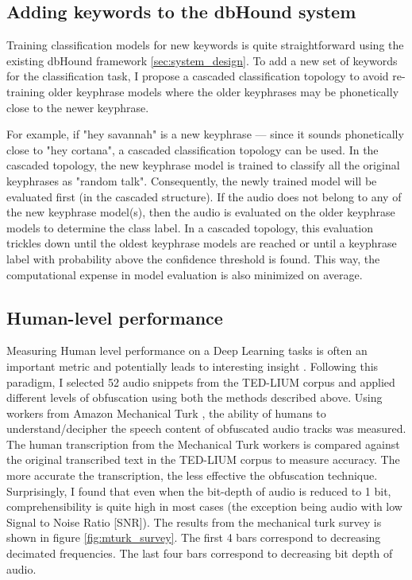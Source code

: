 \subsection{Adding keywords to the dbHound system}

Training classification models for new keywords is quite straightforward using the existing dbHound framework \ref{sec:system_design}.
 To add a new set of keywords for the classification task, I propose a cascaded classification topology to avoid re-training older keyphrase models where the older keyphrases may be phonetically close to the newer keyphrase.


For example, if "hey savannah" is a new keyphrase --- since it sounds phonetically close to "hey cortana", a cascaded classification topology can be used.
 In the cascaded topology, the new keyphrase model is trained to classify all the original keyphrases as "random talk".
 Consequently, the newly trained model will be evaluated first (in the cascaded structure).
 If the audio does not belong to any of the new keyphrase model(s), then the audio is evaluated on the older keyphrase models to determine the class label.
 In a cascaded topology, this evaluation trickles down until the oldest keyphrase models are reached or until a keyphrase label with probability above the confidence threshold is found.
 This way, the computational expense in model evaluation is also minimized on average.




\subsection{Human-level performance}

Measuring Human level performance on a Deep Learning tasks is often an important metric and potentially leads to interesting insight \cite{NutsAndBoltsOfDL}.
 Following this paradigm, I selected 52 audio snippets from the TED-LIUM corpus \cite{TEDLIUMCorpus} and applied different levels of obfuscation using both the methods described above.
 Using workers from Amazon Mechanical Turk \cite{mturk}, the ability of humans to understand/decipher the speech content of obfuscated audio tracks was measured.
 The human transcription from the Mechanical Turk workers is compared against the original transcribed text in the TED-LIUM corpus to measure accuracy.
 The more accurate the transcription, the less effective the obfuscation technique.
 Surprisingly, I found that even when the bit-depth of audio is reduced to 1 bit, comprehensibility is quite high in most cases (the exception being audio with low Signal to Noise Ratio [SNR]).
 The results from the mechanical turk survey is shown in figure \ref{fig:mturk_survey}.
 The first 4 bars correspond to decreasing decimated frequencies.
 The last four bars correspond to decreasing bit depth of audio.

